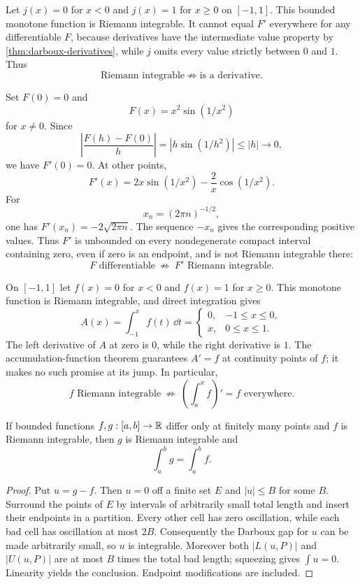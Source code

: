 \begin{example}
Let \(j(x)=0\) for \(x<0\) and \(j(x)=1\) for \(x\geq0\) on
\([-1,1]\). This bounded monotone function is Riemann integrable. It cannot
equal \(F'\) everywhere for any differentiable \(F\), because derivatives
have the intermediate value property by \cref{thm:darboux-derivatives}, while
\(j\) omits every value strictly between \(0\) and \(1\). Thus
\[
\text{Riemann integrable}
\not\Longrightarrow
\text{is a derivative}.
\]
\end{example}

\begin{example}
\label{ex:unbounded-derivative}
Set $F(0)=0$ and
\[
F(x)=x^2\sin(1/x^2)
\]
 for $x\ne0$. Since
\[
\left|\frac{F(h)-F(0)}h\right|=|h\sin(1/h^2)|\leq |h|\longrightarrow0,
\]
we have $F'(0)=0$. At other points,
\[
F'(x)=2x\sin(1/x^2)-\frac2x\cos(1/x^2).
\]
For
\[
x_n=(2\pi n)^{-1/2},
\]
 one has $F'(x_n)=-2\sqrt{2\pi n}$.
The sequence $-x_n$ gives the corresponding positive values. Thus $F'$
is unbounded on every nondegenerate compact interval containing zero,
even if zero is an endpoint, and is not Riemann integrable there:
\[
F\text{ differentiable}\ \not\Longrightarrow\ F'\text{ Riemann integrable}.
\]
\end{example}

\begin{example}
\label{ex:step-accumulation}
On $[-1,1]$ let $f(x)=0$ for $x<0$ and $f(x)=1$ for $x\geq0$.
This monotone function is Riemann integrable, and direct integration gives
\[
A(x)=\int_{-1}^x f(t)\,\dd t
=\begin{cases}0,&-1\leq x\leq0,\\x,&0\leq x\leq1.\end{cases}
\]
The left derivative of $A$ at zero is $0$, while the right derivative is
$1$. The accumulation-function theorem guarantees $A'=f$ at continuity
points of $f$; it makes no such promise at its jump. In particular,
\[
f\text{ Riemann integrable}\ \not\Longrightarrow\
\left(\int_a^x f\right)'=f\text{ everywhere}.
\]
\end{example}

\begin{lemma}
\label{lem:finite-modifications}
If bounded functions $f,g:[a,b]\to\mathbb{R}$ differ only at finitely many points
and $f$ is Riemann integrable, then $g$ is Riemann integrable and
\[
\int_a^b g=\int_a^b f.
\]
\end{lemma}
\begin{proof}
Put $u=g-f$. Then $u=0$ off a finite set $E$ and $|u|\leq B$ for some
$B$. Surround the points of $E$ by intervals of arbitrarily small total
length and insert their endpoints in a partition. Every other cell has
zero oscillation, while each bad cell has oscillation at most $2B$.
Consequently the Darboux gap for $u$ can be made arbitrarily small, so $u$
is integrable. Moreover both $|L(u,P)|$ and $|U(u,P)|$ are at most $B$
times the total bad length; squeezing gives $\int u=0$. Linearity yields
the conclusion. Endpoint modifications are included.
\end{proof}

